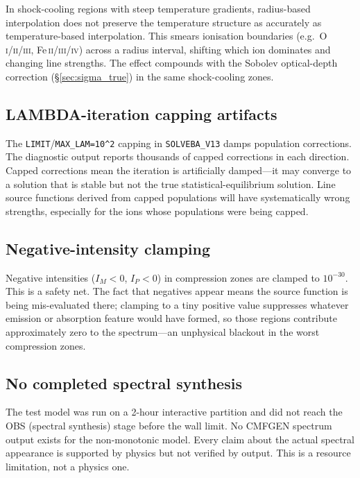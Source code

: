 \documentclass[11pt,a4paper]{article}
\begin{document}
In shock-cooling regions with steep temperature gradients, radius-based
interpolation does not preserve the temperature structure as accurately
as temperature-based interpolation.  This smears ionisation boundaries
(e.g.\ O\,\textsc{i}/\textsc{ii}/\textsc{iii},
Fe\,\textsc{ii}/\textsc{iii}/\textsc{iv}) across a radius interval,
shifting which ion dominates and changing line strengths.  The effect
compounds with the Sobolev optical-depth correction
(\S\ref{sec:sigma_true}) in the same shock-cooling zones.

\subsection{LAMBDA-iteration capping artifacts}

The \texttt{LIMIT}/\texttt{MAX\_LAM=10^2} capping in
\texttt{SOLVEBA\_V13} damps population corrections.  The diagnostic
output reports thousands of capped corrections in each direction.
Capped corrections mean the iteration is artificially damped---it may
converge to a solution that is stable but not the true
statistical-equilibrium solution.  Line source functions derived from
capped populations will have systematically wrong strengths, especially
for the ions whose populations were being capped.

\subsection{Negative-intensity clamping}

Negative intensities ($I_M < 0$, $I_P < 0$) in compression zones are
clamped to $10^{-30}$.  This is a safety net.  The fact that negatives
appear means the source function is being mis-evaluated there; clamping
to a tiny positive value suppresses whatever emission or absorption
feature would have formed, so those regions contribute approximately
zero to the spectrum---an unphysical blackout in the worst compression
zones.

\subsection{No completed spectral synthesis}

The test model was run on a 2-hour interactive partition and did not
reach the OBS (spectral synthesis) stage before the wall limit.  No
CMFGEN spectrum output exists for the non-monotonic model.  Every claim
about the actual spectral appearance is supported by physics but not
verified by output.  This is a resource limitation, not a physics one.
\end{document}
